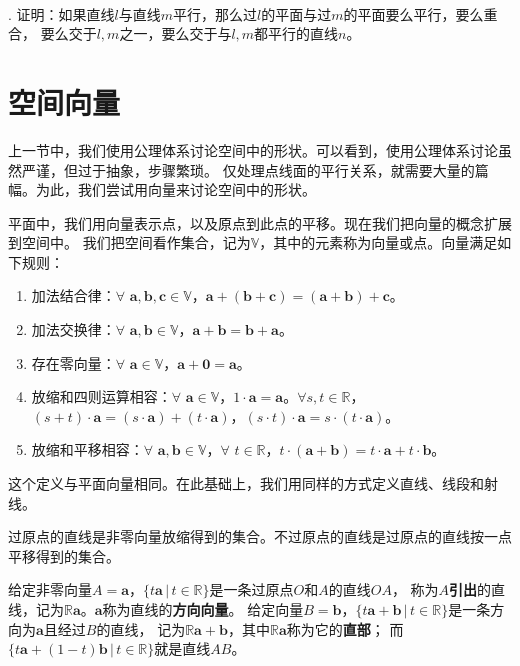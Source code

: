 \documentclass[12pt,UTF8]{ctexbook}
\begin{document}
\begin{xt}
    \mbox{} \\
    . 证明：如果直线$l$与直线$m$平行，那么过$l$的平面与过$m$的平面要么平行，要么重合，
    要么交于$l,m$之一，要么交于与$l,m$都平行的直线$n$。 
\end{xt}


\section{空间向量}

上一节中，我们使用公理体系讨论空间中的形状。可以看到，使用公理体系讨论虽然严谨，但过于抽象，步骤繁琐。
仅处理点线面的平行关系，就需要大量的篇幅。为此，我们尝试用向量来讨论空间中的形状。

平面中，我们用向量表示点，以及原点到此点的平移。现在我们把向量的概念扩展到空间中。
我们把空间看作集合，记为$\mathbb{V}$，其中的元素称为向量或点。向量满足如下规则：

\begin{enumerate}
    \item 加法结合律：$\forall \,\, \mathbf{a}, \mathbf{b}, \mathbf{c} \in \mathbb{V}$，$\mathbf{a}+ (\mathbf{b} + \mathbf{c}) = (\mathbf{a} + \mathbf{b}) + \mathbf{c}$。
    \item 加法交换律：$\forall \,\, \mathbf{a}, \mathbf{b} \in \mathbb{V}$，$\mathbf{a} + \mathbf{b} = \mathbf{b} + \mathbf{a}$。
    \item 存在零向量：$\forall \,\, \mathbf{a} \in \mathbb{V}$，$\mathbf{a} + \mathbf{0} = \mathbf{a}$。
    \item 放缩和四则运算相容：$\forall \,\, \mathbf{a} \in \mathbb{V}$，$1\cdot \mathbf{a} = \mathbf{a}$。$\forall s, t \in \mathbb{R}$，$(s + t)\cdot\mathbf{a} = (s\cdot\mathbf{a}) + (t\cdot\mathbf{a})$，$(s \cdot t)\cdot \mathbf{a} = s \cdot (t\cdot \mathbf{a})$。
    \item 放缩和平移相容：$\forall \,\, \mathbf{a}, \mathbf{b} \in \mathbb{V}$，$\forall \,\, t \in \mathbb{R}$，$t\cdot(\mathbf{a} + \mathbf{b}) = t\cdot\mathbf{a} + t\cdot\mathbf{b}$。
\end{enumerate}

这个定义与平面向量相同。在此基础上，我们用同样的方式定义直线、线段和射线。
\begin{df}
    过原点的直线是非零向量放缩得到的集合。不过原点的直线是过原点的直线按一点平移得到的集合。
\end{df}
给定非零向量$A = \mathbf{a}$，$ \{t\mathbf{a} \, | \, t\in\mathbb{R}\}$是一条过原点$O$和$A$的直线$OA$，
称为$A$\textbf{引出}的直线，记为$\mathbb{R}\mathbf{a}$。$\mathbf{a}$称为直线的\textbf{方向向量}。
给定向量$B = \mathbf{b}$，$ \{t\mathbf{a}+\mathbf{b} \, | \, t\in\mathbb{R}\}$是一条方向为$\mathbf{a}$且经过$B$的直线，
记为$\mathbb{R}\mathbf{a}+\mathbf{b}$，其中$\mathbb{R}\mathbf{a}$称为它的\textbf{直部}；
而$ \{t\mathbf{a}+(1 - t)\mathbf{b} \, | \, t\in\mathbb{R}\}$就是直线$AB$。
\end{document}
